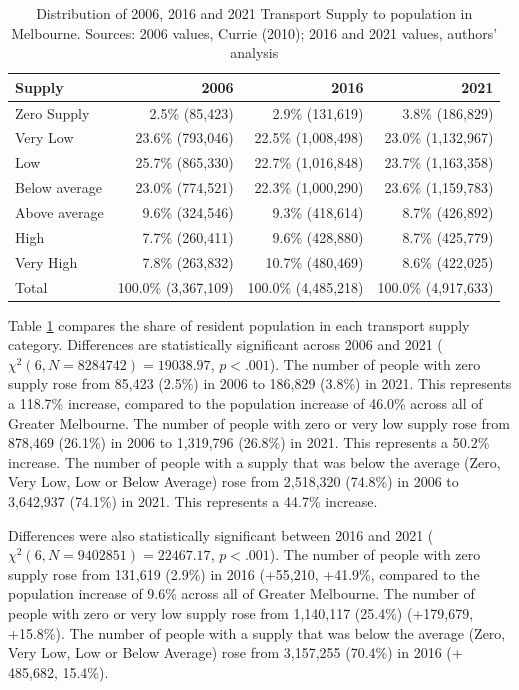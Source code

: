 \documentclass[preprint, 3p,
authoryear]{elsarticle} %
\begin{document}
\begin{table}

\caption{\label{tab:Greater_Melbourne_CCDs_SA1_population}Distribution of 2006, 2016 and 2021 Transport Supply to population in Melbourne. Sources: 2006 values, Currie (2010); 2016 and 2021 values, authors' analysis}
\centering
\begin{tabular}[t]{l|r|r|r}
\hline
Supply & 2006 & 2016 & 2021\\
\hline
Zero Supply & 2.5\%    (85,423) & 2.9\%   (131,619) & 3.8\%   (186,829)\\
\hline
Very Low & 23.6\%   (793,046) & 22.5\% (1,008,498) & 23.0\% (1,132,967)\\
\hline
Low & 25.7\%   (865,330) & 22.7\% (1,016,848) & 23.7\% (1,163,358)\\
\hline
Below average & 23.0\%   (774,521) & 22.3\% (1,000,290) & 23.6\% (1,159,783)\\
\hline
Above average & 9.6\%   (324,546) & 9.3\%   (418,614) & 8.7\%   (426,892)\\
\hline
High & 7.7\%   (260,411) & 9.6\%   (428,880) & 8.7\%   (425,779)\\
\hline
Very High & 7.8\%   (263,832) & 10.7\%   (480,469) & 8.6\%   (422,025)\\
\hline
Total & 100.0\% (3,367,109) & 100.0\% (4,485,218) & 100.0\% (4,917,633)\\
\hline
\end{tabular}
\end{table}

Table \ref{tab:Greater_Melbourne_CCDs_SA1_population} compares the share
of resident population in each transport supply category. Differences
are statistically significant across 2006 and 2021
(\(\chi^2(6, N = 8284742) = 19038.97\), \(p < .001\)). The number of
people with zero supply rose from 85,423 (2.5\%) in 2006 to 186,829
(3.8\%) in 2021. This represents a 118.7\% increase, compared to the
population increase of 46.0\% across all of Greater Melbourne. The
number of people with zero or very low supply rose from 878,469 (26.1\%)
in 2006 to 1,319,796 (26.8\%) in 2021. This represents a 50.2\%
increase. The number of people with a supply that was below the average
(Zero, Very Low, Low or Below Average) rose from 2,518,320 (74.8\%) in
2006 to 3,642,937 (74.1\%) in 2021. This represents a 44.7\% increase.

Differences were also statistically significant between 2016 and 2021
(\(\chi^2(6, N = 9402851) = 22467.17\), \(p < .001\)). The number of
people with zero supply rose from 131,619 (2.9\%) in 2016 (+55,210,
+41.9\%, compared to the population increase of 9.6\% across all of
Greater Melbourne. The number of people with zero or very low supply
rose from 1,140,117 (25.4\%) (+179,679, +15.8\%). The number of people
with a supply that was below the average (Zero, Very Low, Low or Below
Average) rose from 3,157,255 (70.4\%) in 2016 (+ 485,682, 15.4\%).
\end{document}
